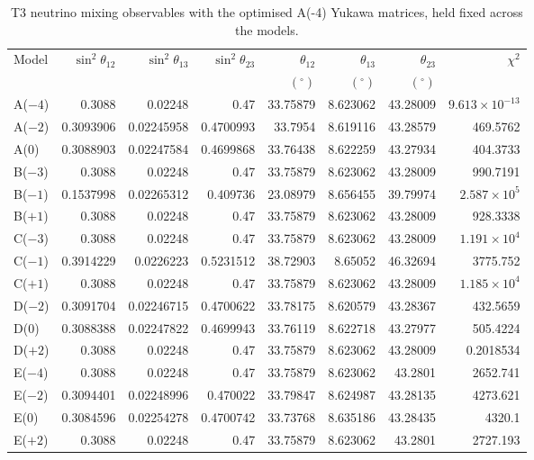 \begin{table}[p]
\centering
\caption{T3 neutrino mixing observables with the optimised A(-4) Yukawa matrices, held fixed across the models.}
\label{tab:appC_Am4_mixing}
\begingroup
\footnotesize
\setlength{\tabcolsep}{3.2pt}
\begin{tabular}{lrrrrrrr}
\hline
Model & $\sin^2\theta_{12}$ & $\sin^2\theta_{13}$ & $\sin^2\theta_{23}$ & $\theta_{12}$ & $\theta_{13}$ & $\theta_{23}$ & $\chi^2$ \\
 &  &  &  & $(^\circ)$ & $(^\circ)$ & $(^\circ)$ &  \\
\hline
A($-4$) & 0.3088 & 0.02248 & 0.47 & 33.75879 & 8.623062 & 43.28009 & $9.613\times10^{-13}$ \\
A($-2$) & 0.3093906 & 0.02245958 & 0.4700993 & 33.7954 & 8.619116 & 43.28579 & 469.5762 \\
A($0$) & 0.3088903 & 0.02247584 & 0.4699868 & 33.76438 & 8.622259 & 43.27934 & 404.3733 \\
B($-3$) & 0.3088 & 0.02248 & 0.47 & 33.75879 & 8.623062 & 43.28009 & 990.7191 \\
B($-1$) & 0.1537998 & 0.02265312 & 0.409736 & 23.08979 & 8.656455 & 39.79974 & $2.587\times10^{5}$ \\
B($+1$) & 0.3088 & 0.02248 & 0.47 & 33.75879 & 8.623062 & 43.28009 & 928.3338 \\
C($-3$) & 0.3088 & 0.02248 & 0.47 & 33.75879 & 8.623062 & 43.28009 & $1.191\times10^{4}$ \\
C($-1$) & 0.3914229 & 0.0226223 & 0.5231512 & 38.72903 & 8.65052 & 46.32694 & 3775.752 \\
C($+1$) & 0.3088 & 0.02248 & 0.47 & 33.75879 & 8.623062 & 43.28009 & $1.185\times10^{4}$ \\
D($-2$) & 0.3091704 & 0.02246715 & 0.4700622 & 33.78175 & 8.620579 & 43.28367 & 432.5659 \\
D($0$) & 0.3088388 & 0.02247822 & 0.4699943 & 33.76119 & 8.622718 & 43.27977 & 505.4224 \\
D($+2$) & 0.3088 & 0.02248 & 0.47 & 33.75879 & 8.623062 & 43.28009 & 0.2018534 \\
E($-4$) & 0.3088 & 0.02248 & 0.47 & 33.75879 & 8.623062 & 43.2801 & 2652.741 \\
E($-2$) & 0.3094401 & 0.02248996 & 0.470022 & 33.79847 & 8.624987 & 43.28135 & 4273.621 \\
E($0$) & 0.3084596 & 0.02254278 & 0.4700742 & 33.73768 & 8.635186 & 43.28435 & 4320.1 \\
E($+2$) & 0.3088 & 0.02248 & 0.47 & 33.75879 & 8.623062 & 43.2801 & 2727.193 \\
\hline
\end{tabular}
\endgroup
\end{table}
